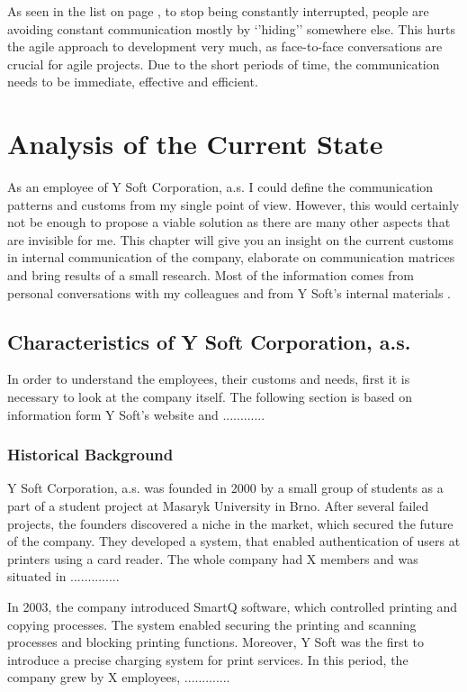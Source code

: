 \documentclass[11pt,singleside]{myfithesis2}
\begin{document}
As seen in the list on page \pageref{list:avoidingCommunication}, to stop being constantly interrupted, people are avoiding constant communication mostly by `'hiding'' somewhere else. This hurts the agile approach to development very much, as face-to-face conversations are crucial for agile projects. Due to the short periods of time, the communication needs to be immediate, effective and efficient.
	
	
\chapter{Analysis of the Current State}

As an employee of Y Soft Corporation, a.s. I could define the communication patterns and customs from my single point of view. However, this would certainly not be enough to propose a viable solution as there are many other aspects that are invisible for me. This chapter will give you an insight on the current customs in internal communication of the company, elaborate on communication matrices and bring results of a small research. Most of the information comes from personal conversations with my colleagues and from Y Soft's internal materials \cite{ysfotInternal}.

	\section{Characteristics of Y Soft Corporation, a.s.}
In order to understand the employees, their customs and needs, first it is necessary to look at the company itself. The following section is based on information form Y Soft's website \cite{ysoft} and ............

		\subsection{Historical Background}

Y Soft Corporation, a.s. was founded in 2000 by a small group of students as a part of a student project at Masaryk University in Brno. After several failed projects, the founders discovered a niche in the market, which secured the future of the company. They developed a system, that enabled authentication of users at printers using a card reader. The whole company had X members and was situated in ..............

In 2003, the company introduced SmartQ software, which controlled printing and copying processes. The system enabled securing the printing and scanning processes and blocking printing functions. Moreover, Y Soft was the first to introduce a precise charging system for print services. In this period, the company grew by X employees, .............
\end{document}
